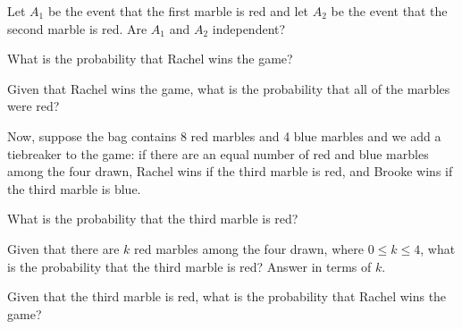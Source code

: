 \documentclass[11pt]{article}
\begin{document}
\begin{Parts}
    \Part Let $A_1$ be the event that the first marble is red and let $A_2$ be 
    the event that the second marble is red. Are $A_1$ and $A_2$ independent?
    
    \Part What is the probability that Rachel wins the game?
    
    \Part Given that Rachel wins the game, what is the probability that all of 
    the marbles were red?
\end{Parts}

Now, suppose the bag contains 8 red marbles and 4 blue marbles and we add a 
tiebreaker to the game: if there are an equal number of red and blue marbles 
among the four drawn, Rachel wins if the third marble is red, and Brooke wins 
if the third marble is blue.

\begin{Parts}[resume]
    \Part What is the probability that the third marble is red?
    
    \Part Given that there are $k$ red marbles among the four drawn, where 
    $0 \leq k \leq 4$, what is the probability that the third marble is red? 
    Answer in terms of $k$.
    
    \Part Given that the third marble is red, what is the probability that 
    Rachel wins the game?
    
\end{Parts}
\end{document}
